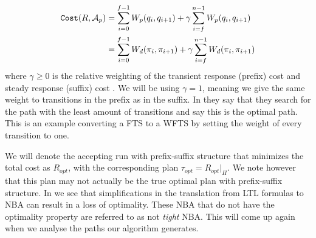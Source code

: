 \begin{align*}
\texttt{Cost} (R, \mathcal{A}_p) &= \sum_{i=0}^{f-1} W_p(q_i,q_{i+1}) + \gamma \sum_{i=f}^{n-1} W_p(q_i,q_{i+1}) \\
&= \sum_{i=0}^{f-1} W_d(\pi_i,\pi_{i+1}) + \gamma \sum_{i=f}^{n-1} W_d(\pi_i, \pi_{i+1})
\end{align*}
where $\gamma \geq 0$ is the relative weighting of the transient response (prefix) cost and steady response (suffix) cost \cite{guo15}. We will be using $\gamma = 1$, meaning we give the same weight to transitions in the prefix as in the suffix. In \cite{fainekos09} they say that they search for the path with the least amount of transitions and say this is the optimal path. This is an example converting a FTS to a WFTS by setting the weight of every transition to one.
 


We will denote the accepting run with prefix-suffix structure that minimizes the total cost as $R_{opt}$, with the corresponding plan $\tau_{opt} = R_{opt}|_\Pi$. We note however that this plan may not actually be the true optimal plan with prefix-suffix structure. In \cite{schuppan05} we see that simplifications in the translation from LTL formulas to NBA can result in a loss of optimality. These NBA that do not have the optimality property are referred to as not \textit{tight} NBA. This will come up again when we analyse the paths our algorithm generates. 
